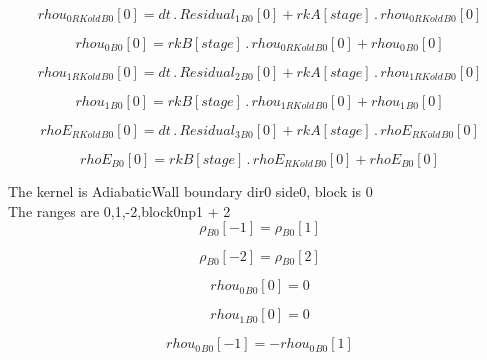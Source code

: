 \documentclass{article}
\begin{document}
\begin{dmath}{rhou_{0 RKold}{_{B0}}}[{0}] = dt \,.\, {Residual_{1}{_{B0}}}[{0}] + {rkA}[{stage}] \,.\, {rhou_{0 RKold}{_{B0}}}[{0}]\end{dmath}

\begin{dmath}{rhou_{0}{_{B0}}}[{0}] = {rkB}[{stage}] \,.\, {rhou_{0 RKold}{_{B0}}}[{0}] + {rhou_{0}{_{B0}}}[{0}]\end{dmath}

\begin{dmath}{rhou_{1 RKold}{_{B0}}}[{0}] = dt \,.\, {Residual_{2}{_{B0}}}[{0}] + {rkA}[{stage}] \,.\, {rhou_{1 RKold}{_{B0}}}[{0}]\end{dmath}

\begin{dmath}{rhou_{1}{_{B0}}}[{0}] = {rkB}[{stage}] \,.\, {rhou_{1 RKold}{_{B0}}}[{0}] + {rhou_{1}{_{B0}}}[{0}]\end{dmath}

\begin{dmath}{rhoE_{RKold}{_{B0}}}[{0}] = dt \,.\, {Residual_{3}{_{B0}}}[{0}] + {rkA}[{stage}] \,.\, {rhoE_{RKold}{_{B0}}}[{0}]\end{dmath}

\begin{dmath}{rhoE{_{B0}}}[{0}] = {rkB}[{stage}] \,.\, {rhoE_{RKold}{_{B0}}}[{0}] + {rhoE{_{B0}}}[{0}]\end{dmath}

\noindent The kernel is AdiabaticWall boundary dir0 side0, block is 0\\\noindent The ranges are 0,1,-2,block0np1 + 2\\\begin{dmath}{\rho{_{B0}}}[{-1}] = {\rho{_{B0}}}[{1}]\end{dmath}

\begin{dmath}{\rho{_{B0}}}[{-2}] = {\rho{_{B0}}}[{2}]\end{dmath}

\begin{dmath}{rhou_{0}{_{B0}}}[{0}] = 0\end{dmath}

\begin{dmath}{rhou_{1}{_{B0}}}[{0}] = 0\end{dmath}

\begin{dmath}{rhou_{0}{_{B0}}}[{-1}] = - {rhou_{0}{_{B0}}}[{1}]\end{dmath}
\end{document}
